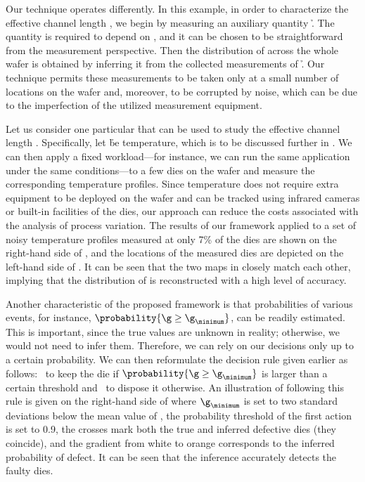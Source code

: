 Our technique operates differently. In this example, in order to characterize
the effective channel length \g, we begin by measuring an auxiliary quantity \h.
The quantity is required to depend on \g, and it can be chosen to be
straightforward from the measurement perspective. Then the distribution of \g
across the whole wafer is obtained by inferring it from the collected
measurements of \h. Our technique permits these measurements to be taken only at
a small number of locations on the wafer and, moreover, to be corrupted by
noise, which can be due to the imperfection of the utilized measurement
equipment.

Let us consider one particular \h that can be used to study the effective
channel length \g. Specifically, let \h be temperature, which is to be discussed
further in . We can then apply a fixed workload---for
instance, we can run the same application under the same conditions---to a few
dies on the wafer and measure the corresponding temperature profiles. Since
temperature does not require extra equipment to be deployed on the wafer and can
be tracked using infrared cameras \cite{mesa-martinez2007} or built-in
facilities of the dies, our approach can reduce the costs associated with the
analysis of process variation. The results of our framework applied to a set of
noisy temperature profiles measured at only 7\% of the dies are shown on the
right-hand side of , and the locations of
the measured dies are depicted on the left-hand side of
. It can be seen that the two maps in
 closely match each other, implying that the
distribution of \g is reconstructed with a high level of accuracy.

Another characteristic of the proposed framework is that probabilities of
various events, for instance, $\probability{\g \geq \g_\minimum}$, can be
readily estimated. This is important, since the true values are unknown in
reality; otherwise, we would not need to infer them. Therefore, we can rely on
our decisions only up to a certain probability. We can then reformulate the
decision rule given earlier as follows: \one~to keep the die if $\probability{\g
\geq \g_\minimum}$ is larger than a certain threshold and \two~to dispose it
otherwise. An illustration of following this rule is given on the right-hand
side of  where $\g_\minimum$ is set to two
standard deviations below the mean value of \g, the probability threshold of the
first action is set to 0.9, the crosses mark both the true and inferred
defective dies (they coincide), and the gradient from white to orange
corresponds to the inferred probability of defect. It can be seen that the
inference accurately detects the faulty dies.

